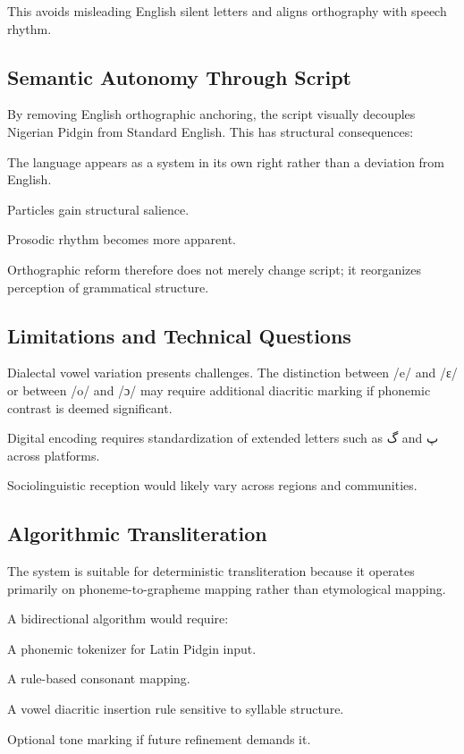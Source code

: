 \documentclass[12pt]{article}
\begin{document}
This avoids misleading English silent letters and aligns orthography with speech rhythm.

\subsection{Semantic Autonomy Through Script}

By removing English orthographic anchoring, the script visually decouples Nigerian Pidgin from Standard English. This has structural consequences:

The language appears as a system in its own right rather than a deviation from English.

Particles gain structural salience.

Prosodic rhythm becomes more apparent.

Orthographic reform therefore does not merely change script; it reorganizes perception of grammatical structure.

\subsection{Limitations and Technical Questions}

Dialectal vowel variation presents challenges. The distinction between /e/ and /ɛ/ or between /o/ and /ɔ/ may require additional diacritic marking if phonemic contrast is deemed significant.

Digital encoding requires standardization of extended letters such as گ and پ across platforms.

Sociolinguistic reception would likely vary across regions and communities.

\subsection{Algorithmic Transliteration}

The system is suitable for deterministic transliteration because it operates primarily on phoneme-to-grapheme mapping rather than etymological mapping.

A bidirectional algorithm would require:

A phonemic tokenizer for Latin Pidgin input.

A rule-based consonant mapping.

A vowel diacritic insertion rule sensitive to syllable structure.

Optional tone marking if future refinement demands it.
\end{document}

